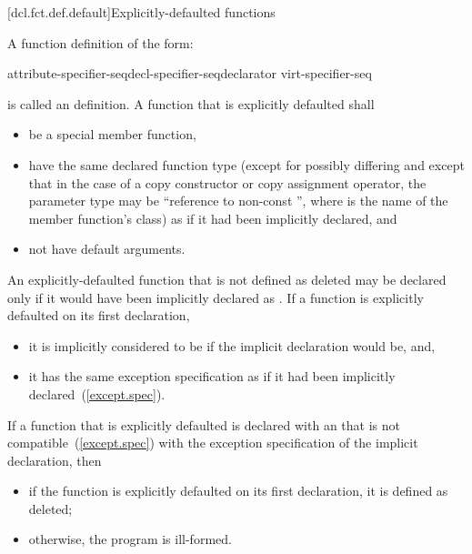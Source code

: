 [dcl.fct.def.default]{Explicitly-defaulted functions}%

\pnum
A function definition of the form:

\begin{ncbnf}
    attribute-specifier-seq\opt decl-specifier-seq\opt declarator virt-specifier-seq\opt {}
\end{ncbnf}

is called an  definition.
A function that is explicitly defaulted shall

\begin{itemize}
\item be a special member function,

\item have the same declared function type (except for possibly differing
 and except that in the case of a copy constructor or
copy assignment operator, the parameter type may be ``reference to non-const '',
where  is the name of the member function's class) as if it had been implicitly
declared, and

\item not have default arguments.
\end{itemize}

\pnum
An explicitly-defaulted function that is not defined as deleted may be declared
 only if it would have been implicitly declared as
. If
a function is explicitly defaulted on its first declaration,

\begin{itemize}
\item it is implicitly considered to be  if the implicit
declaration would be, and,
\item it has the same exception specification
as if it had been implicitly declared~(\ref{except.spec}).
\end{itemize}

\pnum
If a function that is explicitly defaulted is declared with an
 that is not compatible~(\ref{except.spec})
with the exception specification of the implicit declaration, then

\begin{itemize}
\item if the function is explicitly defaulted on its first declaration, it is defined as deleted;
\item otherwise, the program is ill-formed.
\end{itemize}

